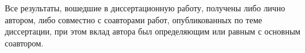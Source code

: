 {\contribution} Все результаты, вошедшие в диссертационную работу, получены либо лично автором, либо совместно с соавторами работ, опубликованных по теме диссертации, при этом вклад автора был определяющим или равным с основным соавтором.


